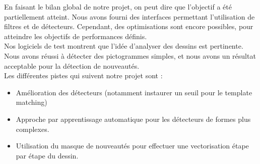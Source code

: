 En faisant le bilan global de notre projet, on peut dire que l'objectif a été partiellement atteint. Nous avons fourni des interfaces permettant l'utilisation de filtres et de détecteurs. Cependant, des optimisations sont encore possibles, pour atteindre les objectifs de performances définis.\\

Nos logiciels de test montrent que l'idée d'analyser des dessins est pertinente. Nous avons réussi à détecter des pictogrammes simples, et nous avons un résultat acceptable pour la détection de nouveautés.\\

Les différentes pistes qui suivent notre projet sont :
\begin{itemize}
\item Amélioration des détecteurs (notamment instaurer un seuil pour le template matching)
\item Approche par apprentissage automatique pour les détecteurs de formes plus complexes.
\item Utilisation du masque de nouveautés pour effectuer une vectorisation étape par étape du dessin.
\end{itemize}